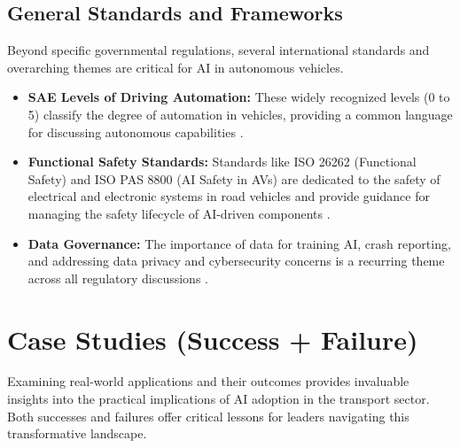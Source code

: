 \subsection{General Standards and Frameworks}
Beyond specific governmental regulations, several international standards and overarching themes are critical for AI in autonomous vehicles.
\begin{itemize}
    \item \textbf{SAE Levels of Driving Automation:} These widely recognized levels (0 to 5) classify the degree of automation in vehicles, providing a common language for discussing autonomous capabilities \cite{ResearchGate_SAE}.
    \item \textbf{Functional Safety Standards:} Standards like ISO 26262 (Functional Safety) and ISO PAS 8800 (AI Safety in AVs) are dedicated to the safety of electrical and electronic systems in road vehicles and provide guidance for managing the safety lifecycle of AI-driven components \cite{IJISRT_ISO}.
    \item \textbf{Data Governance:} The importance of data for training AI, crash reporting, and addressing data privacy and cybersecurity concerns is a recurring theme across all regulatory discussions \cite{HolisticAI_EU_AI_Act}.
\end{itemize}

\section{Case Studies (Success + Failure)}

Examining real-world applications and their outcomes provides invaluable insights into the practical implications of AI adoption in the transport sector. Both successes and failures offer critical lessons for leaders navigating this transformative landscape.

